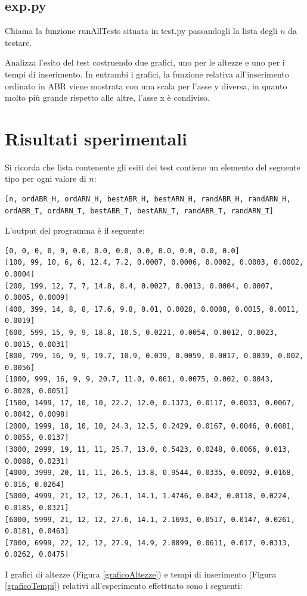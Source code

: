 \documentclass[]{article}
\begin{document}
\subsection*{exp.py}
Chiama la funzione runAllTests situata in test.py passandogli la lista degli $n$ da testare.

Analizza l'esito del test costruendo due grafici, uno per le altezze e uno per i tempi di inserimento. In entrambi i grafici, la funzione relativa all'inserimento ordinato in ABR viene mostrata con una scala per l'asse y diversa, in quanto molto più grande rispetto alle altre, l'asse x è condiviso.

\section{Risultati sperimentali}
Si ricorda che lista contenente gli esiti dei test contiene un elemento del seguente tipo per ogni valore di $n$:
\begin{verbatim}
[n, ordABR_H, ordARN_H, bestABR_H, bestARN_H, randABR_H, randARN_H,
ordABR_T, ordARN_T, bestABR_T, bestARN_T, randABR_T, randARN_T]
\end{verbatim}

L'output del programma è il seguente:
\begin{verbatim}
[0, 0, 0, 0, 0, 0.0, 0.0, 0.0, 0.0, 0.0, 0.0, 0.0, 0.0]
[100, 99, 10, 6, 6, 12.4, 7.2, 0.0007, 0.0006, 0.0002, 0.0003, 0.0002, 0.0004]
[200, 199, 12, 7, 7, 14.8, 8.4, 0.0027, 0.0013, 0.0004, 0.0007, 0.0005, 0.0009]
[400, 399, 14, 8, 8, 17.6, 9.8, 0.01, 0.0028, 0.0008, 0.0015, 0.0011, 0.0019]
[600, 599, 15, 9, 9, 18.8, 10.5, 0.0221, 0.0054, 0.0012, 0.0023, 0.0015, 0.0031]
[800, 799, 16, 9, 9, 19.7, 10.9, 0.039, 0.0059, 0.0017, 0.0039, 0.002, 0.0056]
[1000, 999, 16, 9, 9, 20.7, 11.0, 0.061, 0.0075, 0.002, 0.0043, 0.0028, 0.0051]
[1500, 1499, 17, 10, 10, 22.2, 12.0, 0.1373, 0.0117, 0.0033, 0.0067, 0.0042, 0.0098]
[2000, 1999, 18, 10, 10, 24.3, 12.5, 0.2429, 0.0167, 0.0046, 0.0081, 0.0055, 0.0137]
[3000, 2999, 19, 11, 11, 25.7, 13.0, 0.5423, 0.0248, 0.0066, 0.013, 0.0088, 0.0231]
[4000, 3999, 20, 11, 11, 26.5, 13.8, 0.9544, 0.0335, 0.0092, 0.0168, 0.016, 0.0264]
[5000, 4999, 21, 12, 12, 26.1, 14.1, 1.4746, 0.042, 0.0118, 0.0224, 0.0185, 0.0321]
[6000, 5999, 21, 12, 12, 27.6, 14.1, 2.1693, 0.0517, 0.0147, 0.0261, 0.0181, 0.0463]
[7000, 6999, 22, 12, 12, 27.9, 14.9, 2.8899, 0.0611, 0.017, 0.0313, 0.0262, 0.0475]
\end{verbatim}

I grafici di altezze (Figura \ref{graficoAltezze}) e tempi di inserimento (Figura \ref{graficoTempi}) relativi all'esperimento effettuato sono i seguenti:
\end{document}
